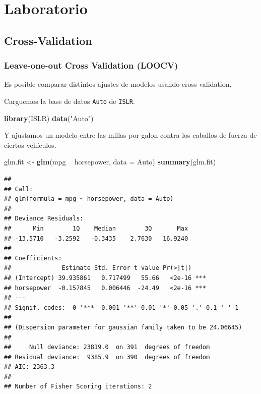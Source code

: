 \documentclass[
  12pt,
]{book}
\newenvironment{Shaded}{\begin{snugshade}}{\end{snugshade}}
\newcommand{\DataTypeTok}[1]{\textcolor[rgb]{0.13,0.29,0.53}{#1}}
\newcommand{\KeywordTok}[1]{\textcolor[rgb]{0.13,0.29,0.53}{\textbf{#1}}}
\newcommand{\NormalTok}[1]{#1}
\newcommand{\OperatorTok}[1]{\textcolor[rgb]{0.81,0.36,0.00}{\textbf{#1}}}
\newcommand{\StringTok}[1]{\textcolor[rgb]{0.31,0.60,0.02}{#1}}
\theoremstyle{definition}
\theoremstyle{definition}
\theoremstyle{definition}
\theoremstyle{remark}
\begin{document}
\hypertarget{laboratorio-6}{%
\section{Laboratorio}\label{laboratorio-6}}

\hypertarget{cross-validation}{%
\subsection{Cross-Validation}\label{cross-validation}}

\hypertarget{leave-one-out-cross-validation-loocv}{%
\subsubsection{Leave-one-out Cross Validation (LOOCV)}\label{leave-one-out-cross-validation-loocv}}

Es posible comparar distintos ajustes de modelos usando cross-validation.

Carguemos la base de datos \texttt{Auto} de \texttt{ISLR}.

\begin{Shaded}
\begin{Highlighting}[]
\KeywordTok{library}\NormalTok{(ISLR)}
\KeywordTok{data}\NormalTok{(}\StringTok{"Auto"}\NormalTok{)}
\end{Highlighting}
\end{Shaded}

Y ajustamos un modelo entre las millas por galon contra los caballos de fuerza de ciertos vehículos.

\begin{Shaded}
\begin{Highlighting}[]
\NormalTok{glm.fit <-}\StringTok{ }\KeywordTok{glm}\NormalTok{(mpg }\OperatorTok{~}\StringTok{ }\NormalTok{horsepower, }\DataTypeTok{data =}\NormalTok{ Auto)}
\KeywordTok{summary}\NormalTok{(glm.fit)}
\end{Highlighting}
\end{Shaded}

\begin{verbatim}
## 
## Call:
## glm(formula = mpg ~ horsepower, data = Auto)
## 
## Deviance Residuals: 
##      Min        1Q    Median        3Q       Max  
## -13.5710   -3.2592   -0.3435    2.7630   16.9240  
## 
## Coefficients:
##              Estimate Std. Error t value Pr(>|t|)    
## (Intercept) 39.935861   0.717499   55.66   <2e-16 ***
## horsepower  -0.157845   0.006446  -24.49   <2e-16 ***
## ---
## Signif. codes:  0 '***' 0.001 '**' 0.01 '*' 0.05 '.' 0.1 ' ' 1
## 
## (Dispersion parameter for gaussian family taken to be 24.06645)
## 
##     Null deviance: 23819.0  on 391  degrees of freedom
## Residual deviance:  9385.9  on 390  degrees of freedom
## AIC: 2363.3
## 
## Number of Fisher Scoring iterations: 2
\end{verbatim}
\end{document}
